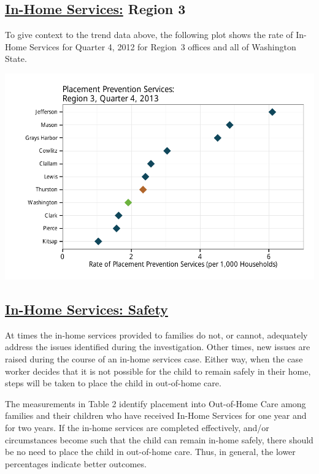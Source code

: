 \documentclass{article}\usepackage{graphicx, color}
\makeatletter
\def\maxwidth{ %
  \ifdim\Gin@nat@width>\linewidth
    \linewidth
  \else
    \Gin@nat@width
  \fi
}
\newenvironment{knitrout}{}{} %
\makeatother
\begin{document}
\subsection{\href{http://www.partnersforourchildren.org/child-well-being/visualizations/home-services/trends}
    {In-Home Services:} Region 3
}
To give context to the trend data above, the following plot shows the rate of In-Home Services for Quarter 4, 2012 for Region~3 offices and all of Washington State.
\nopagebreak[3]
\begin{knitrout}
\color{fgcolor}

{\centering \includegraphics[width=\maxwidth]{figure/ihs_context} 

}



\end{knitrout}



\subsection{\href{http://www.partnersforourchildren.org/child-well-being/visualizations/home-services/safety}
    {In-Home Services: Safety}
}
At times the in-home services provided to families do not, or cannot, adequately address the issues identified during the investigation. Other times, new issues are raised during the course of an in-home services case. Either way, when the case worker decides that it is not possible for the child to remain safely in their home, steps will be taken to place the child in out-of-home care.

The measurements in Table 2 identify placement into Out-of-Home Care among families and their children who have received In-Home Services for one year and for two years. If the in-home services are completed effectively, and/or circumstances become such that the child can remain in-home safely, there should be no need to place the child in out-of-home care. Thus, in general, the lower percentages indicate better outcomes.
\end{document}
